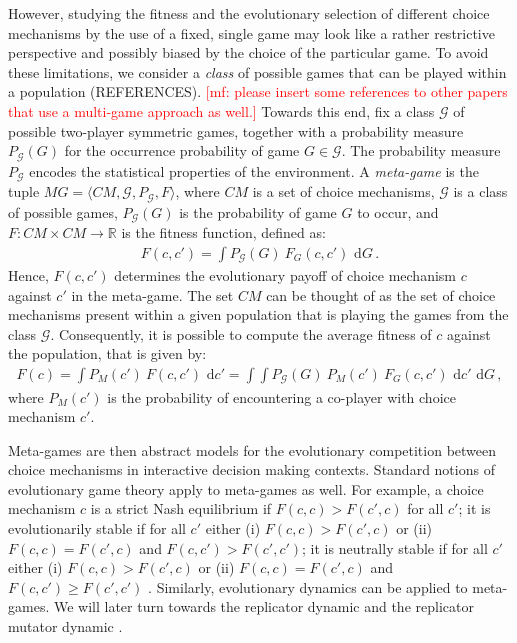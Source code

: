\documentclass[fleqn,reqno,12pt]{article}
\theoremstyle{Satz}
\theoremstyle{Bsp}
\newcommand{\mf}[1]{\textcolor{Red}{[mf: #1]}}
\begin{document}
However, studying the fitness and the evolutionary selection of different choice mechanisms by
the use of a fixed, single game may look like a rather restrictive perspective and possibly
biased by the choice of the particular game. To avoid these limitations, we consider a
\textit{class} of possible games that can be played within a population
(REFERENCES). \mf{please insert some references to other papers that use a multi-game approach
  as well.} Towards this end, fix a class $\mathcal{G}$ of possible two-player symmetric games,
together with a probability measure $P_{\mathcal{G}}(G)$ for the occurrence probability of game
$G \in \mathcal{G}$. The probability measure $P_{\mathcal{G}}$ encodes the statistical
properties of the environment. A \textit{meta-game} is the tuple
$ MG=\langle CM, \mathcal{G}, P_{\mathcal{G}},F \rangle$, where $CM$ is a set of choice
mechanisms, $\mathcal{G}$ is a class of possible games, $P_{\mathcal{G}}(G)$ is the probability
of game $G$ to occur, and $F:CM \times CM \rightarrow \mathbb{R}$ is the fitness function,
defined as:
\begin{align}
  \label{eq:FittnessChoiceMechGamePairwise}
  F(c, c') = \int P_{\mathcal{G}}(G) \  F_G(c,c') \text{ d} G \,.
\end{align}
Hence, $F(c,c')$ determines the evolutionary payoff of choice mechanism $c$ against $c'$ in the
meta-game. The set $CM$ can be thought of as the set of choice mechanisms present within a given
population that is playing the games from the class $\mathcal{G}$. Consequently, it is possible
to compute the average fitness of $c$ against the population, that is given by:
\begin{align}
  \label{eq:FittnessChoiceMechGame}
  F(c) = \int P_{M}(c') \ F(c,c') \text{ d} c' = \int \int P_{\mathcal{G}}(G) \  P_{M}(c') \  F_G(c,c') \text{ d} c' \text{ d} G  \,,
\end{align}
where $P_{M}(c')$ is the probability of
encountering a co-player with choice mechanism $c'$.

Meta-games are then abstract models for the evolutionary competition between choice mechanisms
in interactive decision making contexts.  Standard notions of evolutionary game theory apply to
meta-games as well. For example, a choice mechanism $c$ is a strict Nash equilibrium if
$F(c,c) > F(c',c)$ for all $c'$; it is evolutionarily stable if for all $c'$ either (i)
$F(c,c) > F(c',c)$ or (ii) $F(c,c) = F(c',c)$ and $F(c,c') > F(c',c')$; it is neutrally stable
if for all $c'$ either (i) $F(c,c) > F(c',c)$ or (ii) $F(c,c) = F(c',c)$ and
$F(c,c') \ge F(c',c')$ \citep{Maynard-Smith1982:Evolution-and-t}. Similarly, evolutionary
dynamics can be applied to meta-games. We will later turn towards the replicator dynamic
\citep{TaylorJonker1978:Evolutionary-St} and the replicator mutator dynamic
\citep[e.g.][]{Nowak2006:Evolutionary-Dy}.
\end{document}
